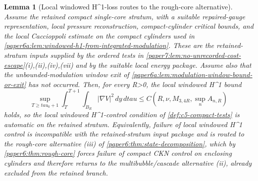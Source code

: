 \documentclass[11pt]{amsart}
\def\({}%
\def\){}%
\def\tau{tau}%
\theoremstyle{plain}
\newtheorem{lemma}[lemma]{Lemma}
\theoremstyle{definition}
\theoremstyle{remark}
\begin{document}
\begin{lemma}[Local windowed \(H^1\)-loss routes to the rough-core alternative]
\label{paper6a:lem:retained-h1-routing}
Assume the retained compact single-core stratum, with a suitable repaired-gauge
representation, local pressure reconstruction, compact-cylinder critical
bounds, and the local Caccioppoli estimate on the compact cylinders used in
\cref{paper6a:lem:windowed-h1-from-integrated-modulation}.  These are the
retained-stratum inputs supplied by the ordered tests in
\cref{paper7:lem:no-unrecorded-cost-escape}\textup{(i),(ii),(iv),(vii)} and by
the suitable local energy package.  Assume also that the unbounded-modulation
window exit of \cref{paper6a:lem:modulation-window-bound-or-exit} has not
occurred.
Then, for every \(R>0\), the local windowed \(H^1\) bound
\[
  \sup_{T\ge\tau_0+1}
  \int_T^{T+1}\int_{B_R}|\nabla V|^2\,dy\,d\tau
  \le C\!\left(R,\nu,M_{3,4R},\sup_n A_{n,R}\right)
\]
holds, so the local windowed \(H^1\)-control condition of
\cref{def:c5-compact-tests} is automatic on the retained stratum.
Equivalently, failure of local windowed \(H^1\) control is incompatible
with the retained-stratum input package and is routed to the rough-core
alternative \textup{(iii)} of \cref{paper6:thm:state-decomposition},
which by \cref{paper6:thm:rough-core} forces failure of compact CKN
control on enclosing cylinders and therefore returns to the
multibubble/cascade alternative \textup{(ii)}, already excluded from the
retained branch.
\end{lemma}
\end{document}
